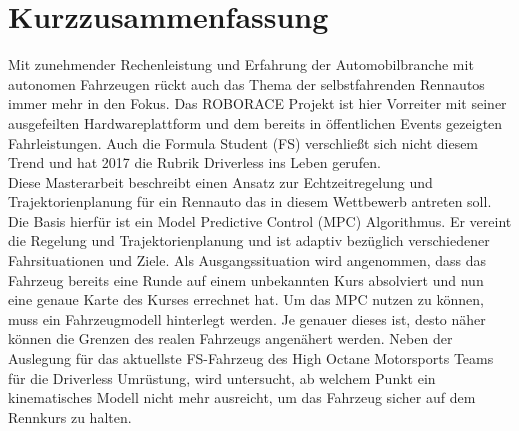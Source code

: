 
\chapter*{Kurzzusammenfassung}

Mit zunehmender Rechenleistung und Erfahrung der Automobilbranche mit autonomen Fahrzeugen rückt auch das Thema der selbstfahrenden Rennautos immer mehr in den Fokus. Das ROBORACE Projekt ist hier Vorreiter mit seiner ausgefeilten Hardwareplattform und dem bereits in öffentlichen Events gezeigten Fahrleistungen. Auch die Formula Student (FS) verschließt sich nicht diesem Trend und hat 2017 die Rubrik Driverless ins Leben gerufen. \\
Diese Masterarbeit beschreibt einen Ansatz zur Echtzeitregelung und Trajektorienplanung für ein Rennauto das in diesem Wettbewerb antreten soll. Die Basis hierfür ist ein Model Predictive Control (MPC) Algorithmus. Er vereint die Regelung und Trajektorienplanung und ist adaptiv bezüglich verschiedener Fahrsituationen und Ziele.
Als Ausgangssituation wird angenommen, dass das Fahrzeug bereits eine Runde auf einem unbekannten Kurs absolviert und nun eine genaue Karte des Kurses errechnet hat. 
Um das MPC nutzen zu können, muss ein Fahrzeugmodell hinterlegt werden. Je genauer dieses ist, desto näher können die Grenzen des realen Fahrzeugs angenähert werden. Neben der Auslegung für das aktuellste FS-Fahrzeug des High Octane Motorsports Teams für die Driverless Umrüstung, wird untersucht, ab welchem Punkt ein kinematisches Modell nicht mehr ausreicht, um das Fahrzeug sicher auf dem Rennkurs zu halten.


